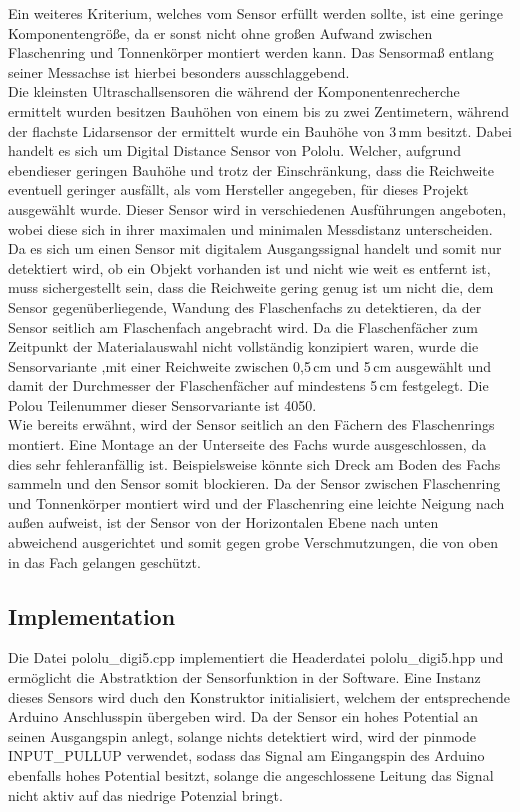         Ein weiteres Kriterium, welches vom Sensor erfüllt werden sollte, ist eine geringe Komponentengröße, da er sonst nicht ohne großen Aufwand zwischen Flaschenring und Tonnenkörper montiert werden kann. Das Sensormaß entlang seiner Messachse ist hierbei besonders ausschlaggebend.\\

        Die kleinsten Ultraschallsensoren die während der Komponentenrecherche ermittelt wurden besitzen Bauhöhen von einem bis zu zwei Zentimetern, während der flachste Lidarsensor der ermittelt wurde ein Bauhöhe von 3\,mm besitzt. Dabei handelt es sich um Digital Distance Sensor von Pololu. Welcher, aufgrund ebendieser geringen Bauhöhe und trotz der Einschränkung, dass die Reichweite eventuell geringer ausfällt, als vom Hersteller angegeben, für dieses Projekt ausgewählt wurde. Dieser Sensor wird in verschiedenen Ausführungen angeboten, wobei diese sich in ihrer maximalen und minimalen Messdistanz unterscheiden. Da es sich um einen Sensor mit digitalem Ausgangssignal handelt und somit nur detektiert wird, ob ein Objekt vorhanden ist und nicht wie weit es entfernt ist, muss sichergestellt sein, dass die Reichweite gering genug ist um nicht die, dem Sensor gegenüberliegende, Wandung des Flaschenfachs zu detektieren, da der Sensor seitlich am Flaschenfach angebracht wird. Da die Flaschenfächer zum Zeitpunkt der Materialauswahl nicht vollständig konzipiert waren, wurde die Sensorvariante ,mit einer Reichweite zwischen 0,5\,cm und 5\,cm ausgewählt und damit der Durchmesser der Flaschenfächer auf mindestens 5\,cm festgelegt. Die Polou Teilenummer dieser Sensorvariante ist 4050.\\
        
        Wie bereits erwähnt, wird der Sensor seitlich an den Fächern des Flaschenrings montiert. Eine Montage an der Unterseite des Fachs wurde ausgeschlossen, da dies sehr fehleranfällig ist. Beispielsweise könnte sich Dreck am Boden des Fachs sammeln und den Sensor somit blockieren. Da der Sensor zwischen Flaschenring und Tonnenkörper montiert wird und der Flaschenring eine leichte Neigung nach außen aufweist, ist der Sensor von der Horizontalen Ebene nach unten abweichend ausgerichtet und somit gegen grobe Verschmutzungen, die von oben in das Fach gelangen geschützt.\\

    \subsection{Implementation}
        Die Datei pololu\_digi5.cpp implementiert die Headerdatei pololu\_digi5.hpp und ermöglicht die Abstratktion der Sensorfunktion in der Software. Eine Instanz dieses Sensors wird duch den Konstruktor initialisiert, welchem der entsprechende Arduino Anschlusspin übergeben wird. Da der Sensor ein hohes Potential an seinen Ausgangspin anlegt, solange nichts detektiert wird, wird der pinmode INPUT\_PULLUP verwendet, sodass das Signal am Eingangspin des Arduino ebenfalls hohes Potential besitzt, solange die angeschlossene Leitung das Signal nicht aktiv auf das niedrige Potenzial bringt.\\

